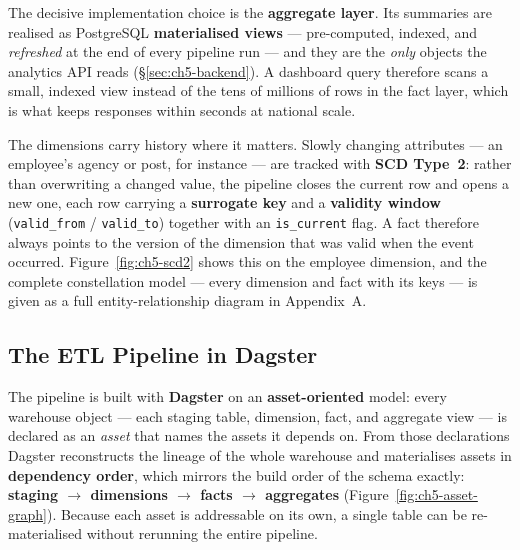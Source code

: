 The decisive implementation choice is the \textbf{aggregate layer}. Its summaries are realised as
PostgreSQL \textbf{materialised views} --- pre-computed, indexed, and \emph{refreshed} at the end of
every pipeline run --- and they are the \emph{only} objects the analytics API reads
(\S\ref{sec:ch5-backend}). A dashboard query therefore scans a small, indexed view instead of the
tens of millions of rows in the fact layer, which is what keeps responses within seconds at national
scale.

The dimensions carry history where it matters. Slowly changing attributes --- an employee's agency or
post, for instance --- are tracked with \textbf{SCD Type~2}: rather than overwriting a changed value,
the pipeline closes the current row and opens a new one, each row carrying a \textbf{surrogate key} and
a \textbf{validity window} (\texttt{valid\_from} / \texttt{valid\_to}) together with an
\texttt{is\_current} flag. A fact therefore always points to the version of the dimension that was valid
when the event occurred. Figure~\ref{fig:ch5-scd2} shows this on the employee dimension, and the
complete constellation model --- every dimension and fact with its keys --- is given as a full
entity-relationship diagram in Appendix~A.


\subsection{The ETL Pipeline in Dagster}

The pipeline is built with \textbf{Dagster} on an \textbf{asset-oriented} model: every warehouse object
--- each staging table, dimension, fact, and aggregate view --- is declared as an \emph{asset} that
names the assets it depends on. From those declarations Dagster reconstructs the lineage of the whole
warehouse and materialises assets in \textbf{dependency order}, which mirrors the build order of the
schema exactly: \textbf{staging $\rightarrow$ dimensions $\rightarrow$ facts $\rightarrow$ aggregates}
(Figure~\ref{fig:ch5-asset-graph}). Because each asset is addressable on its own, a single table can be
re-materialised without rerunning the entire pipeline.

